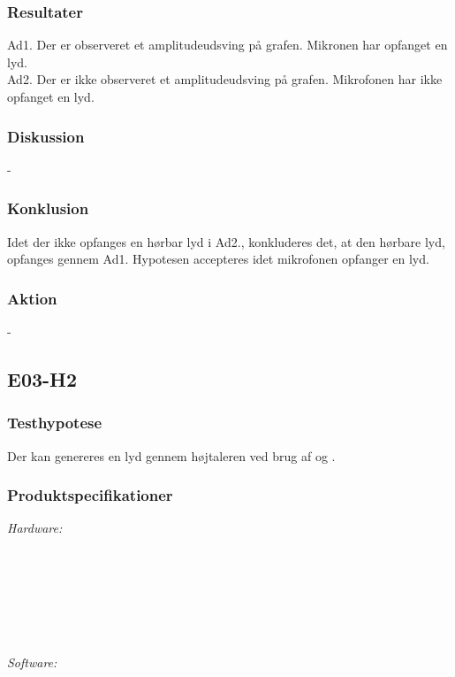 		\subsubsection{Resultater}
		Ad1. Der er observeret et amplitudeudsving på grafen. Mikronen har opfanget en lyd. \\
		Ad2. Der er ikke observeret et amplitudeudsving på grafen. Mikrofonen har ikke opfanget en lyd. 
		
		\subsubsection{Diskussion} 
		- 
		
		\subsubsection{Konklusion}
		Idet der ikke opfanges en hørbar lyd i Ad2., konkluderes det, at den hørbare lyd, opfanges gennem Ad1. 
		Hypotesen accepteres idet mikrofonen opfanger en lyd. 
		\subsubsection{Aktion}
		- 
	
	\subsection{E03-H2}
	\label{subsec:E03}
		\subsubsection{Testhypotese}
		Der kan genereres en lyd gennem højtaleren ved brug af \arduino{} og \labview.
		\subsubsection{Produktspecifikationer}
	
	
		\textit{Hardware:}\\
		\tores\\
		\hojtalerkabel\\
		\kabelsko\\
		\pins\\
		\arduino\\
		\PC\\
		\usbkabel
	
		\textit{Software:}\\
		\labview\\
		\visa\\
		\vi\\
		\ardsw\
	
